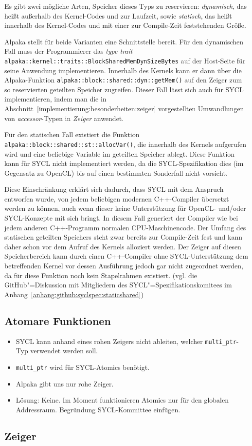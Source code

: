 Es gibt zwei mögliche Arten, Speicher dieses Typs zu reservieren:
\textit{dynamisch}, das heißt außerhalb des Kernel-Codes und zur Laufzeit, sowie
\textit{statisch}, das heißt innerhalb des Kernel-Codes und mit einer zur
Compile-Zeit feststehenden Größe.

Alpaka stellt für beide Varianten eine Schnittstelle bereit. Für den dynamischen
Fall muss der Programmierer das \textit{type trait}
\texttt{alpaka::kernel::traits::BlockSharedMemDynSizeBytes} auf der Host-Seite
für seine Anwendung implementieren. Innerhalb des Kernels kann er dann über die
Alpaka-Funktion \texttt{alpaka::block::shared::dyn::getMem()} auf den Zeiger
zum so reservierten geteilten Speicher zugreifen. Dieser Fall lässt sich auch
für SYCL implementieren, indem man die in
Abschnitt~\ref{implementierung:besonderheiten:zeiger} vorgestellten
Umwandlungen von \textit{accessor}-Typen in \textit{Zeiger} anwendet.

Für den statischen Fall existiert die Funktion
\texttt{alpaka::block::shared::st::allocVar()}, die innerhalb des Kernels
aufgerufen wird und eine beliebige Variable im geteilten Speicher ablegt. Diese
Funktion kann für SYCL nicht implementiert werden, da die SYCL-Spezifikation
dies (im Gegensatz zu OpenCL) bis auf einen bestimmten Sonderfall
\cite[siehe][Abschnitt 4.8.5.3]{sycl2019} nicht vorsieht.

Diese Einschränkung erklärt sich dadurch, dass SYCL mit dem Anspruch entworfen
wurde, von jedem beliebigen modernen C++-Compiler übersetzt werden zu können,
auch wenn dieser keine Unterstützung für OpenCL- und/oder SYCL-Konzepte mit sich
bringt. In diesem Fall generiert der Compiler wie bei jedem anderen C++-Programm
normalen CPU-Maschinencode. Der Umfang des statischen geteilten Speichers steht
zwar bereits zur Compile-Zeit fest und kann daher schon vor dem Aufruf des
Kernels alloziert werden. Der Zeiger auf diesen Speicherbereich kann durch einen
C++-Compiler ohne SYCL-Unterstützung dem betreffenden Kernel vor dessen
Ausführung jedoch gar nicht zugeordnet werden, da für diese Funktion noch kein
Stapelrahmen existiert. (vgl. die GitHub"=Diskussion mit Mitgliedern des
SYCL"=Spezifikationskomitees im
Anhang~\ref{anhang:github:syclspec:staticshared})

\subsection{Atomare Funktionen}\label{implementierung:probleme:atomics}

\begin{itemize}
    \item SYCL kann anhand eines rohen Zeigers nicht ableiten, welcher
          \texttt{multi\_ptr}-Typ verwendet werden soll.
    \item \texttt{multi\_ptr} wird für SYCL-Atomics benötigt.
    \item Alpaka gibt uns nur rohe Zeiger.
    \item Lösung: Keine. Im Moment funktionieren Atomics nur für den globalen
          Addressraum. Begründung SYCL-Kommittee einfügen.
\end{itemize}

\subsection{Zeiger}
